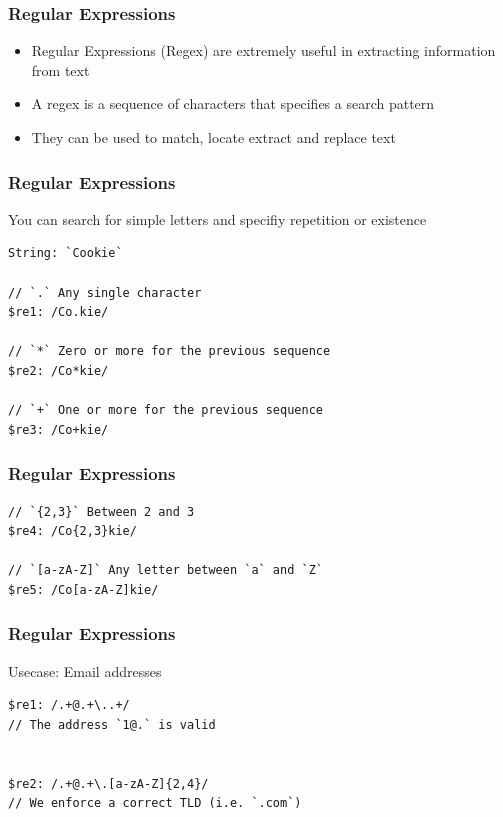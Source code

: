 \documentclass{beamer}
\begin{document}
\begin{frame}
\frametitle{Regular Expressions}
    \begin{itemize}
        \item Regular Expressions (Regex) are extremely useful in extracting information from text
	    \item A regex is a sequence of characters that specifies a search pattern
        \item They can be used to match, locate extract and replace text
    \end{itemize}
\end{frame}

\begin{frame}[fragile]
\frametitle{Regular Expressions}
You can search for simple letters and specifiy repetition or existence

\begin{lstlisting}
String: `Cookie`

// `.` Any single character
$re1: /Co.kie/

// `*` Zero or more for the previous sequence
$re2: /Co*kie/

// `+` One or more for the previous sequence
$re3: /Co+kie/
\end{lstlisting}
\end{frame}

\begin{frame}[fragile]
\frametitle{Regular Expressions}
\begin{lstlisting}
// `{2,3}` Between 2 and 3
$re4: /Co{2,3}kie/

// `[a-zA-Z]` Any letter between `a` and `Z`
$re5: /Co[a-zA-Z]kie/ 
\end{lstlisting}
\end{frame}


\begin{frame}[fragile]
\frametitle{Regular Expressions}
Usecase: Email addresses
\begin{lstlisting}
$re1: /.+@.+\..+/ 
// The address `1@.` is valid


$re2: /.+@.+\.[a-zA-Z]{2,4}/ 
// We enforce a correct TLD (i.e. `.com`)

\end{lstlisting}
\end{frame}
\end{document}
